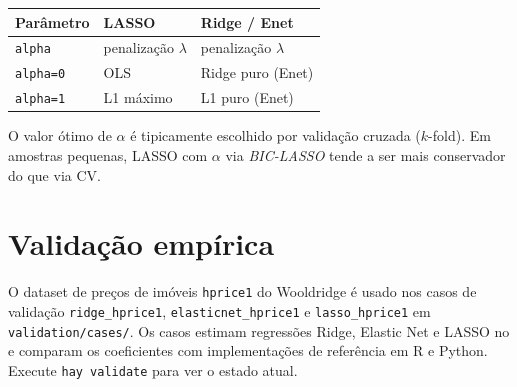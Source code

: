 \begin{center}
\begin{tabular}{lll}
\toprule
\textbf{Parâmetro} & \textbf{LASSO} & \textbf{Ridge / Enet} \\
\midrule
\texttt{alpha} & penalização $\lambda$ & penalização $\lambda$ \\
\texttt{alpha=0} & OLS & Ridge puro (Enet) \\
\texttt{alpha=1} & L1 máximo & L1 puro (Enet) \\
\bottomrule
\end{tabular}
\end{center}

\begin{nota}
  O valor ótimo de $\alpha$ é tipicamente escolhido por validação cruzada
  ($k$-fold). Em amostras pequenas, LASSO com $\alpha$ via \emph{BIC-LASSO}
  tende a ser mais conservador do que via CV.
\end{nota}

\section{Validação empírica}

O dataset de preços de imóveis \texttt{hprice1} do Wooldridge é usado nos casos
de validação \texttt{ridge_hprice1}, \texttt{elasticnet_hprice1} e
\texttt{lasso_hprice1} em \texttt{validation/cases/}. Os casos estimam
regressões Ridge, Elastic Net e LASSO no \hayashi{} e comparam os coeficientes
com implementações de referência em R e Python. Execute \lstinline{hay validate}
para ver o estado atual.
